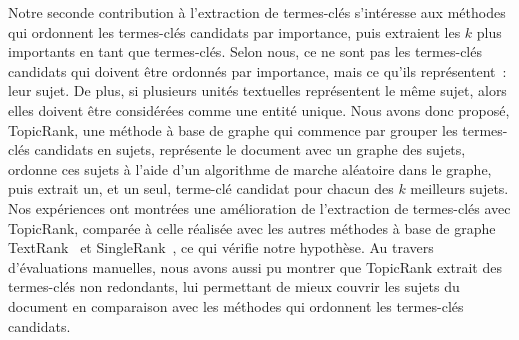     Notre seconde contribution à l'extraction de termes-clés s'intéresse aux
    méthodes qui ordonnent les termes-clés candidats par importance, puis
    extraient les $k$ plus importants en tant que termes-clés. Selon nous, ce ne
    sont pas les termes-clés candidats qui doivent être ordonnés par importance,
    mais ce qu'ils représentent~: leur sujet. De plus, si plusieurs unités
    textuelles représentent le même sujet, alors elles doivent être considérées
    comme une entité unique. Nous avons donc proposé, TopicRank, une méthode à
    base de graphe qui commence par grouper les termes-clés candidats en sujets,
    représente le document avec un graphe des sujets, ordonne ces sujets à
    l'aide d'un algorithme de marche aléatoire dans le graphe, puis extrait un,
    et un seul, terme-clé candidat pour chacun des $k$ meilleurs sujets. Nos
    expériences ont montrées une amélioration de l'extraction de termes-clés
    avec TopicRank, comparée à celle réalisée avec les autres méthodes à base de
    graphe TextRank~\cite{mihalcea2004textrank} et
    SingleRank~\cite{wan2008expandrank}, ce qui vérifie notre hypothèse. Au
    travers d'évaluations manuelles, nous avons aussi pu montrer que TopicRank
    extrait des termes-clés non redondants, lui permettant de mieux couvrir les
    sujets du document en comparaison avec les méthodes qui ordonnent les
    termes-clés candidats.

